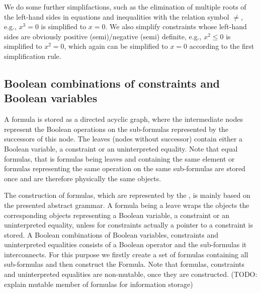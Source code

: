 We do some further simplifactions, such as the elimination of multiple roots of the left-hand sides in equations and inequalities with the relation symbol $\neq$, e.g., $x^3=0$ is simplified to $x=0$. We also simplify constraints whose left-hand sides are obviously positive (semi)/negative (semi) definite, e.g., $x^2\leq 0$ is simplified to $x^2=0$, which again can be simplified to $x=0$ according to the first simplification rule.

\subsection{Boolean combinations of constraints and Boolean variables}
A formula is stored as a directed acyclic graph, where the intermediate nodes represent the Boolean operations on the sub-formulas represented by the successors of this node. The leaves (nodes without successor) contain either a Boolean variable, a constraint or an uninterpreted equality. Note that equal formulas, that is formulas being leaves and containing the same element or formulas representing the same operation on the same sub-formulas are stored once and are therefore physically the same objects.

The construction of formulas, which are represented by the \formulaClass, is mainly based on the presented abstract grammar. A formula being a leave wraps the objects the corresponding objects representing a Boolean variable, a constraint or an uninterpreted equality, unless for constraints actually a pointer to a constraint is stored. A Boolean combinations of Boolean variables, constraints and uninterpreted equalities consists of a Boolean operator and the sub-formulas it interconnects. For this purpose we firstly create a set of formulas containing all sub-formulas and then construct the Formula. Note that formulas, constraints and uninterpreted equalities are non-mutable, once they are constructed. (TODO: explain mutable member of formulas for information storage) 

